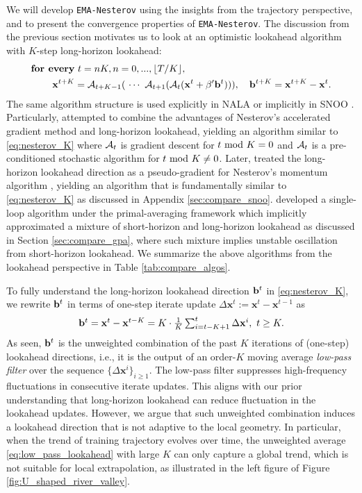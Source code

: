 \documentclass{article}
\theoremstyle{plain}
\theoremstyle{definition}
\theoremstyle{remark}
\def\algname{{\tt EMA-Nesterov}}
\def\bx{\mathbf{x}}
\begin{document}
We will develop {\algname} using the insights from the trajectory perspective, and to present the convergence properties of {\algname}. The discussion from the previous section motivates us to look at an optimistic lookahead algorithm with $K$-step long-horizon lookahead:
\begin{equation}\label{eq:nesterov_K}
    \begin{aligned}
    \textbf{for every}&~ t=nK, n = 0, ..., \lfloor T/K \rfloor,\\
        \bx^{t+K} &= {\cal A}_{t+K-1}(~\cdots ~{\cal A}_{t+1}( {\cal A}_t(\bx^t + \beta' {\bf b}^t) ) ), \quad {\bf b}^{t+K} = \bx^{t+K} - \bx^{t} .
    \end{aligned}
\end{equation}
The same algorithm structure is used explicitly in NALA \citep{zuo2024nala} or implicitly in SNOO \citep{kallusky2025snoo}.
Particularly, \cite{zuo2024nala} attempted to combine the advantages of Nesterov's accelerated gradient method and long-horizon lookahead, yielding an algorithm similar to \eqref{eq:nesterov_K} where ${\cal A}_t$ is gradient descent for $t ~{\rm mod} ~K = 0$ and ${\cal A}_t$ is a pre-conditioned stochastic algorithm for $t ~{\rm mod} ~K\neq 0$. Later, \cite{kallusky2025snoo} treated the long-horizon lookahead direction as a pseudo-gradient for Nesterov's momentum algorithm \citep{sutskever2013importance}, yielding an algorithm that is fundamentally similar to \eqref{eq:nesterov_K} as discussed in Appendix \ref{sec:compare_snoo}. \cite{defazio2025smoothing} developed a single-loop algorithm under the primal-averaging framework which implicitly approximated a mixture of short-horizon and long-horizon lookahead as discussed in Section \ref{sec:compare_gpa}, where such mixture implies unstable oscillation from short-horizon lookahead. We summarize the above algorithms from the lookahead perspective in Table \ref{tab:compare_algos}.

To fully understand the long-horizon lookahead direction ${\bf b}^t$ in \eqref{eq:nesterov_K}, we rewrite ${\bf b}^t$ in terms of one-step iterate update $\Delta \bx^t := \bx^t - \bx^{t-1}$ as
\begin{equation} \label{eq:low_pass_lookahead}
\textstyle {\bf b}^t = \bx^{t} - \bx^{t-K} = K \cdot \frac{1}{K}\sum_{i=t-K+1}^{t} \Delta \bx^i,~t \geq K. 
\end{equation}
As seen, ${\bf b}^t$ is the unweighted combination of the past $K$ iterations of (one-step) lookahead directions, i.e., it is the output of an order-$K$ moving average \emph{low-pass filter}
over the sequence $\{ \Delta \bx^i \}_{i \geq 1}$. The low-pass filter suppresses high-frequency fluctuations in consecutive iterate updates. This aligns with our prior understanding that long-horizon lookahead can reduce fluctuation in the lookahead updates. However, we argue that such unweighted combination induces a lookahead direction that is not adaptive to the local geometry. In particular, when the trend of training trajectory evolves over time, the unweighted average \eqref{eq:low_pass_lookahead} with large $K$ can only capture a global trend, which is not suitable for local extrapolation, as illustrated in the left figure of Figure \ref{fig:U_shaped_river_valley}.
\end{document}
